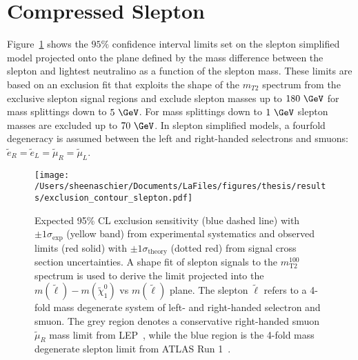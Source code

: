   \section{Compressed Slepton}
 Figure~\ref{fig:exclusion_contour_slepton} shows the $95\%$ confidence interval limits set on the slepton simplified model projected onto the plane defined by the mass difference between the slepton and lightest neutralino as a function of the slepton mass.  These limits are based on an exclusion fit that exploits the shape of the $m_{T2}$ spectrum from the exclusive slepton signal regions and exclude slepton masses up to $180~\GeV$ for mass splittings down to $5~\GeV$.  For mass splittings down to $1~\GeV$ slepton masses are excluded up to $70~\GeV$.  In slepton simplified models, a fourfold degeneracy is assumed between the left and right-handed selectrons and smuons: $\tilde{e}_R=\tilde{e}_L=\tilde{\mu}_R=\tilde{\mu}_L$.
  \begin{figure}
 \centering
 \texttt{[image: /Users/sheenaschier/Documents/LaFiles/figures/thesis/results/exclusion\_contour\_slepton.pdf]}
  \caption{
Expected 95\% CL exclusion sensitivity (blue dashed line) with $\pm 1 \sigma_\text{exp}$ (yellow band) from experimental systematics
and observed limits (red solid) with $\pm 1 \sigma_\text{theory}$ (dotted red) from signal cross section uncertainties.
A shape fit of slepton signals to the $m_\text{T2}^{100}$ spectrum is used to derive
the limit projected into the $m(\tilde{\ell}) - m(\tilde{\chi}^0_1)$ vs $m(\tilde{\ell})$ plane.
The slepton $\tilde{\ell}$ refers to a 4-fold mass degenerate system of left- and right-handed selectron and smuon.
The grey region denotes a conservative right-handed smuon $\tilde{\mu}_R$ mass limit from LEP~\cite{LEPlimits},
while the blue region is the 4-fold mass degenerate slepton limit from ATLAS Run 1~\cite{SUSY-2013-11}.}
   \label{fig:exclusion_contour_slepton}
 \end{figure}
 
